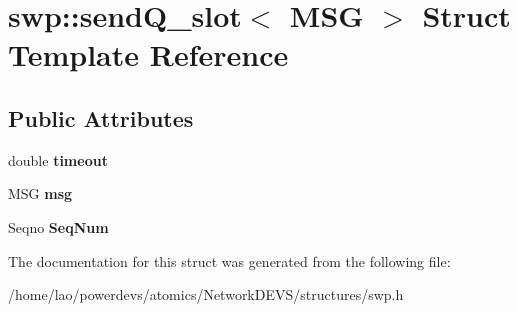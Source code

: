 \hypertarget{structswp_1_1sendQ__slot}{}\section{swp\+:\+:send\+Q\+\_\+slot$<$ M\+SG $>$ Struct Template Reference}
\label{structswp_1_1sendQ__slot}
\subsection*{Public Attributes}
\begin{DoxyCompactItemize}
\item 
double {\bfseries timeout}\hypertarget{structswp_1_1sendQ__slot_ac7f48feba5a37de64a0350e713009631}{}\label{structswp_1_1sendQ__slot_ac7f48feba5a37de64a0350e713009631}

\item 
M\+SG {\bfseries msg}\hypertarget{structswp_1_1sendQ__slot_aabf605e66a139fd95bc1fd7f608bb6ba}{}\label{structswp_1_1sendQ__slot_aabf605e66a139fd95bc1fd7f608bb6ba}

\item 
Seqno {\bfseries Seq\+Num}\hypertarget{structswp_1_1sendQ__slot_a88d9b195d48145a5722fe9034b9942df}{}\label{structswp_1_1sendQ__slot_a88d9b195d48145a5722fe9034b9942df}

\end{DoxyCompactItemize}


The documentation for this struct was generated from the following file\+:\begin{DoxyCompactItemize}
\item 
/home/lao/powerdevs/atomics/\+Network\+D\+E\+V\+S/structures/swp.\+h\end{DoxyCompactItemize}
